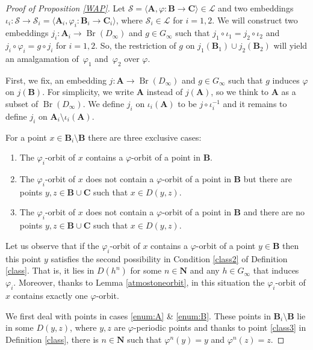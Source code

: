 \documentclass[JEP,XML,SOM,Unicode,NoFloatCountersInSection]{cedram}
\newenvironment{enumerateA}
{\bgroup\def\theenumi{\Alph{enumi}}\begin{enumerate}}
{\end{enumerate}\egroup}
\let\mathcal\mathscr
\theoremstyle{plain}
\theoremstyle{definition}
\newcommand{\bA}{{\boldsymbol{A}}}
\newcommand{\bB}{{\boldsymbol{B}}}
\newcommand{\bC}{{\boldsymbol{C}}}
\newcommand{\NN}{\mathbf{N}}
\newcommand{\cL}{\mathcal{L}}
\newcommand{\cS}{\mathcal{S}}
\DeclareMathOperator{\Br}{Br}
\begin{document}
\begin{proof}[Proof of Proposition \ref{WAP}] Let $\cS=\langle \bA,\varphi\colon\bB\to\bC\rangle\in\cL$ and two embeddings $\iota_i\colon\cS\to \cS_i=\langle \bA_i,\varphi_i\colon \bB_i\to\bC_i\rangle$, where $\cS_i\in\cL$ for $i=1,2$. We will construct two embeddings $j_i\colon \bA_i\to \Br(D_\infty)$ and $g\in G_\infty$ such that $j_1\circ \iota_1=j_2\circ \iota_2$ and $j_i\circ\varphi_i=g\circ j_i$ for $i=1,2$. So, the restriction of $g$ on $j_1(\bB_1)\cup j_2(\bB_2)$
will yield an amalgamation of~$\varphi_1$ and~$\varphi_2$ over $\varphi$.

First, we fix, an embedding $j\colon \bA\to\Br(D_\infty)$ and $g\in G_\infty$ such that $g$ induces $\varphi$ on $j(\bB)$. For simplicity, we write $\bA$ instead of $j(\bA)$, so we think to $\bA$ as a subset of $\Br(D_\infty)$. We define $j_i$ on $\iota_i(\bA)$ to be $j\circ\iota_i^{-1}$ and it remains to define $j_i$ on $\bA_i\setminus\iota_i(\bA)$.

For a point $x\in \bB_i\setminus\bB$ there are three exclusive cases:
\begin{enumerateA}
\item\label{enum:A} The $\varphi_i$-orbit of $x$ contains a $\varphi$-orbit of a point in $\bB$.
\item\label{enum:B} The $\varphi_i$-orbit of $x$ does not contain a $\varphi$-orbit of a point in $\bB$ but there are points $y,z\in \bB\cup \bC$ such that $x\in D(y,z)$.
\item\label{enum:C} The $\varphi_i$-orbit of $x$ does not contain a $\varphi$-orbit of a point in $\bB$ and there are no points $y,z\in \bB\cup \bC$ such that $x\in D(y,z)$.
\end{enumerateA}

Let us observe that if the $\varphi_i$-orbit of $x$ contains a $\varphi$-orbit of a point $y\in\bB$ then this point $y$ satisfies the second possibility in Condition \eqref{class2} of Definition \ref{class}. That is, it lies in $D(h^n)$ for some $n\in\NN$ and any $h\in G_\infty$ that induces $\varphi_i$. Moreover, thanks to Lemma \ref{atmostoneorbit}, in this situation the $\varphi_i$-orbit of $x$ contains exactly one $\varphi$-orbit.

We first deal with points in cases \eqref{enum:A} \& \eqref{enum:B}. These points in $\bB_i\setminus\bB$ lie in some $D(y,z)$, where $y,z$ are $\varphi$-periodic points and thanks to point \eqref{class3} in Definition \ref{class}, there is $n\in\NN$ such that $\varphi^n(y)=y$ and $\varphi^n(z)=z$.


\end{proof}
\end{document}
